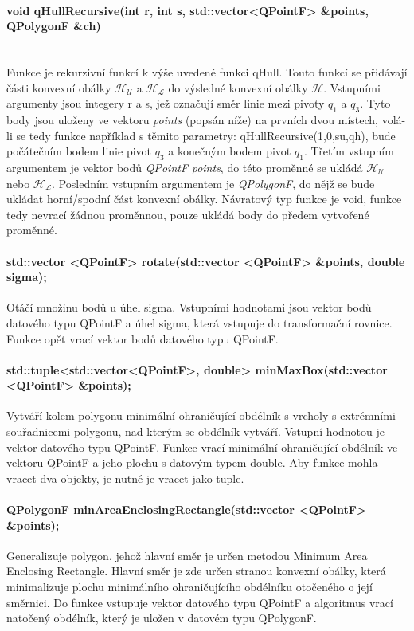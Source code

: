 \documentclass[11pt]{article}
\begin{document}
	\paragraph{void qHullRecursive(int r, int s, std::vector<QPointF> \&points, QPolygonF \&ch)}\mbox{}\\
	Funkce je rekurzivní funkcí k výše uvedené funkci qHull. Touto funkcí se přidávají části konvexní obálky $\mathcal{H_U}$ a $\mathcal{H_L}$ do výsledné konvexní obálky $\mathcal{H}$.
 	Vstupními argumenty jsou integery r a s, jež označují směr linie mezi pivoty \textit{$ q_1 $} a \textit{$ q_3 $}. Tyto body jsou uloženy ve vektoru \textit{points} (popsán níže) na prvních dvou místech, volá-li se tedy funkce například s těmito parametry: qHullRecursive(1,0,su,qh), bude počátečním bodem linie pivot \textit{$ q_3 $} a konečným bodem pivot \textit{$ q_1 $}. Třetím vstupním argumentem je vektor bodů \textit{QPointF} \textit{points}, do této proměnné se ukládá  $\mathcal{H_U}$ nebo $\mathcal{H_L}$. Posledním vstupním argumentem je \textit{QPolygonF}, do nějž se bude ukládat horní/spodní část konvexní obálky. Návratový typ funkce je void, funkce tedy nevrací žádnou proměnnou, pouze ukládá body do předem vytvořené proměnné.
 	
 	\paragraph{std::vector <QPointF> rotate(std::vector <QPointF> \&points, double sigma);}
 	Otáčí množinu bodů u úhel sigma. Vstupními hodnotami jsou vektor bodů datového typu QPointF a úhel sigma, která vstupuje do transformační rovnice. Funkce opět vrací vektor bodů datového typu QPointF.
 	
 	\paragraph{std::tuple<std::vector<QPointF>, double> minMaxBox(std::vector <QPointF> \&points);}
 	Vytváří kolem polygonu minimální ohraničující obdélník s vrcholy s extrémními souřadnicemi polygonu, nad kterým se obdélník vytváří. Vstupní hodnotou je vektor datového typu QPointF. Funkce vrací minimální ohraničující obdélník ve vektoru QPointF a jeho plochu s datovým typem double. Aby funkce mohla vracet dva objekty, je nutné je vracet jako tuple.
 	
 	\paragraph{QPolygonF minAreaEnclosingRectangle(std::vector <QPointF> \&points);}
 	Generalizuje polygon, jehož hlavní směr je určen metodou Minimum Area Enclosing Rectangle. Hlavní směr je zde určen stranou konvexní obálky, která minimalizuje plochu minimálního ohraničujícího obdélníku otočeného o její směrnici. Do funkce vstupuje vektor datového typu QPointF a algoritmus vrací natočený obdélník, který je uložen v datovém typu QPolygonF.
 	
\end{document}
